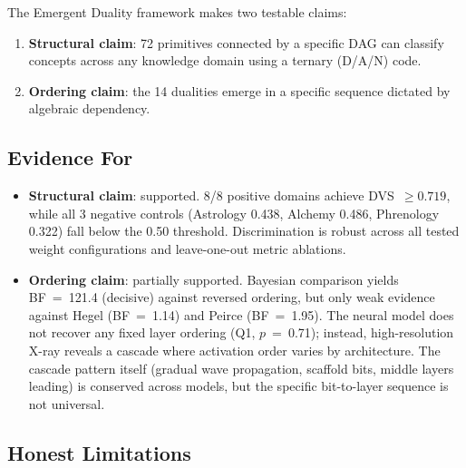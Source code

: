\documentclass[11pt, a4paper]{article}
\begin{document}
The Emergent Duality framework makes two testable claims:

\begin{enumerate}[nosep, leftmargin=*]
    \item \textbf{Structural claim}: 72 primitives connected by a specific DAG can classify concepts across any knowledge domain using a ternary (D/A/N) code.
    \item \textbf{Ordering claim}: the 14 dualities emerge in a specific sequence dictated by algebraic dependency.
\end{enumerate}

\subsection{Evidence For}

\begin{itemize}[nosep, leftmargin=*]
    \item \textbf{Structural claim}: supported. 8/8 positive domains achieve DVS~$\geq 0.719$, while all 3 negative controls (Astrology 0.438, Alchemy 0.486, Phrenology 0.322) fall below the 0.50 threshold. Discrimination is robust across all tested weight configurations and leave-one-out metric ablations.
    \item \textbf{Ordering claim}: partially supported. Bayesian comparison yields BF~=~121.4 (decisive) against reversed ordering, but only weak evidence against Hegel (BF~=~1.14) and Peirce (BF~=~1.95). The neural model does not recover any fixed layer ordering (Q1, $p$~=~0.71); instead, high-resolution X-ray reveals a cascade where activation order varies by architecture. The cascade pattern itself (gradual wave propagation, scaffold bits, middle layers leading) is conserved across models, but the specific bit-to-layer sequence is not universal.
\end{itemize}

\subsection{Honest Limitations}
\end{document}
